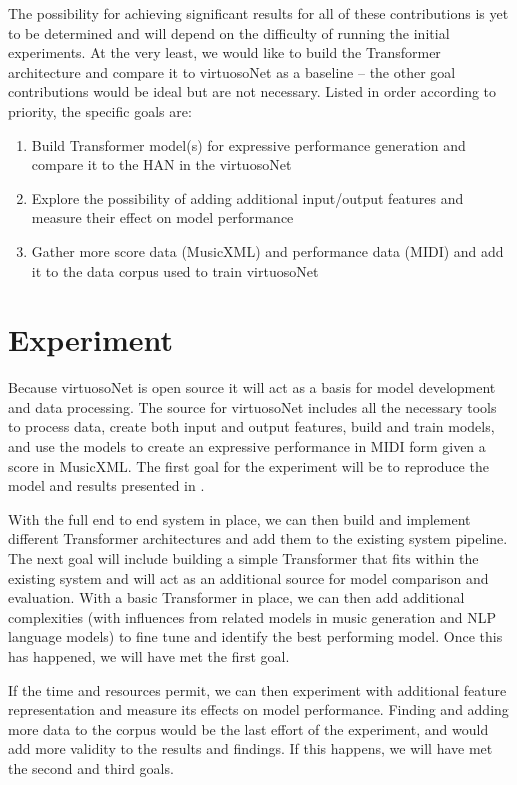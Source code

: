 \documentclass[letterpaper,12pt]{article}
\begin{document}
The possibility for achieving significant results for all of these contributions is yet to be determined and will depend on the difficulty of running the initial experiments. At the very least, we would like to build the Transformer architecture and compare it to virtuosoNet as a baseline – the other goal contributions would be ideal but are not necessary. Listed in order according to priority, the specific goals are: 

\begin{enumerate}
	\item Build Transformer model(s) for expressive performance generation and compare it to the HAN in the virtuosoNet
	\item Explore the possibility of adding additional input/output features and measure their effect on model performance
	\item Gather more score data (MusicXML) and performance data (MIDI) and add it to the data corpus used to train virtuosoNet
\end{enumerate}

\section{Experiment}
Because virtuosoNet is open source it will act as a basis for model development and data processing. The source for virtuosoNet includes all the necessary tools to process data, create both input and output features, build and train models, and use the models to create an expressive performance in MIDI form given a score in MusicXML. The first goal for the experiment will be to reproduce the model and results presented in \cite{jeong2019virtuosonet}. 

With the full end to end system in place, we can then build and implement different Transformer architectures and add them to the existing system pipeline. The next goal will include building a simple Transformer that fits within the existing system and will act as an additional source for model comparison and evaluation. With a basic Transformer in place, we can then add additional complexities (with influences from related models in music generation and NLP language models) to fine tune and identify the best performing model. Once this has happened, we will have met the first goal. 

If the time and resources permit, we can then experiment with additional feature representation and measure its effects on model performance. Finding and adding more data to the corpus would be the last effort of the experiment, and would add more validity to the results and findings. If this happens, we will have met the second and third goals. 
\end{document}
